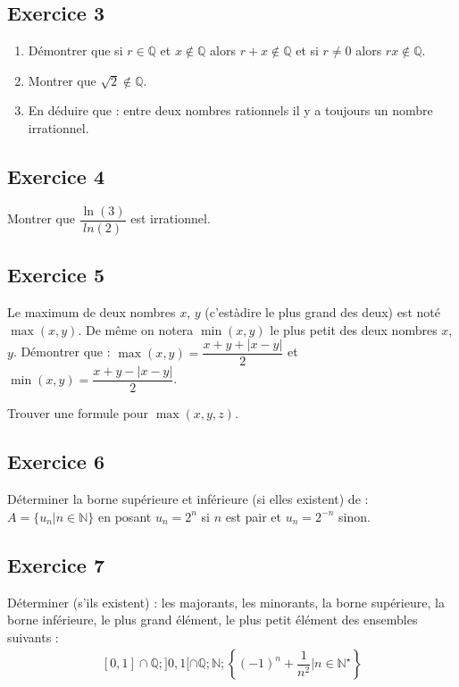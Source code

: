 \documentclass[letterpaper,10pt,french]{jupyterBook}
\begin{document}
\subsection{Exercice 3}
\label{\detokenize{exo1:exercice-3}}\begin{enumerate}
%
\item {} 
\sphinxAtStartPar
Démontrer que si \( r\in \mathbb{Q}\) et \(x \notin \mathbb{Q}\) alors \(r +x \notin \mathbb{Q}\) et si \(r \neq 0\) alors \(rx \notin \mathbb{Q}\).

\item {} 
\sphinxAtStartPar
Montrer que \(\sqrt{2}\notin \mathbb{Q}\).

\item {} 
\sphinxAtStartPar
En déduire que : entre deux nombres rationnels il y a toujours un nombre irrationnel.

\end{enumerate}


\subsection{Exercice 4}
\label{\detokenize{exo1:exercice-4}}
\sphinxAtStartPar
Montrer que \(\dfrac{\ln (3)}{ln (2)}\) est irrationnel.


\subsection{Exercice 5}
\label{\detokenize{exo1:exercice-5}}
\sphinxAtStartPar
Le maximum de deux nombres \(x\), \(y\) (c’est\sphinxhyphen{}à\sphinxhyphen{}dire le plus grand des deux) est noté \(\max(x, y)\). De même on notera
\(\min(x, y)\) le plus petit des deux nombres \(x\), \(y\). Démontrer que :
\(\max(x, y) = \dfrac{x+y+|x−y|}{2}\) et \(\min(x, y) = \dfrac{x+y−|x−y|}{2}\).

\sphinxAtStartPar
Trouver une formule pour \(\max(x, y,z)\).


\subsection{Exercice 6}
\label{\detokenize{exo1:exercice-6}}
\sphinxAtStartPar
Déterminer la borne supérieure et inférieure (si elles existent) de : \(A = \{u_n | n \in \mathbb{N}\}\) en posant \(u_n = 2^n\)
si \(n\) est pair et \(u_n = 2^{−n}\) sinon.


\subsection{Exercice 7}
\label{\detokenize{exo1:exercice-7}}
\sphinxAtStartPar
Déterminer (s’ils existent) : les majorants, les minorants, la borne supérieure, la borne inférieure, le plus grand
élément, le plus petit élément des ensembles suivants :
\begin{equation*}
\begin{split}
[0, 1]\cap \mathbb{Q}; ]0, 1[\cap \mathbb{Q}; \mathbb{N}; \left\{(-1)^n + \dfrac{1}{n^2} | n \in \mathbb{N}^\star \right\}
\end{split}
\end{equation*}
\end{document}
